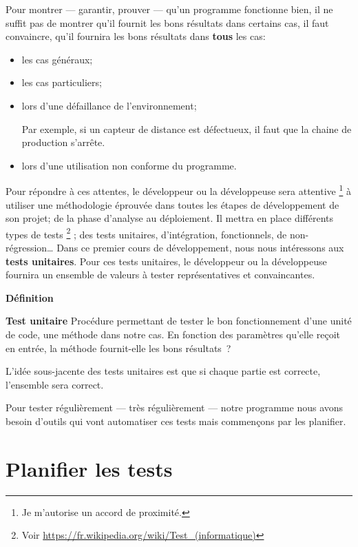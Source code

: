 Pour montrer --- garantir, prouver --- qu'un programme fonctionne bien, il ne
suffit pas de montrer qu'il fournit les bons résultats dans certains cas, il
faut convaincre, qu'il fournira les bons résultats dans \textbf{tous} les cas:

\begin{itemize}
	\item les cas généraux;
	\item les cas particuliers;
	\item lors d'une défaillance de l'environnement;
		
		Par exemple, si un capteur de distance est défectueux, il faut que la 
		chaine de production s'arrête. 
	
	\item lors d'une utilisation non conforme du programme.
\end{itemize}

Pour répondre à ces attentes, le développeur ou la développeuse sera attentive
\footnote{Je m'autorise un accord de proximité.}
à utiliser une méthodologie éprouvée dans toutes les étapes de développement de
son projet; de la phase d'analyse au déploiement.  Il mettra en place différents
types de tests
\footnote{Voir \url{https://fr.wikipedia.org/wiki/Test_(informatique)}}
; des tests unitaires, d'intégration, fonctionnels, de non-régression… Dans ce
premier cours de développement, nous nous intéressons aux \textbf{tests
unitaires}.  Pour ces tests unitaires, le développeur ou la développeuse
fournira un ensemble de valeurs à tester représentatives et convaincantes. 

\textbf{Définition}

\textbf{Test unitaire} Procédure permettant de tester le bon fonctionnement
d'une unité de code, une méthode  dans notre cas. En fonction des
paramètres qu'elle reçoit en entrée, la méthode fournit-elle les bons résultats~? 

L'idée sous-jacente des tests unitaires est que si chaque partie est correcte,
l'ensemble sera correct. 

Pour tester régulièrement --- très régulièrement --- notre programme nous avons
besoin d'outils qui vont automatiser ces tests mais commençons par les
planifier. 


\section{Planifier les tests}

